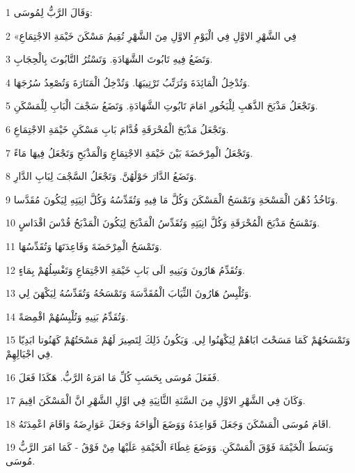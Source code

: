 \par 1 وَقَالَ الرَّبُّ لِمُوسَى:
\par 2 «فِي الشَّهْرِ الاوَّلِ فِي الْيَوْمِ الاوَّلِ مِنَ الشَّهْرِ تُقِيمُ مَسْكَنَ خَيْمَةِ الاجْتِمَاعِ
\par 3 وَتَضَعُ فِيهِ تَابُوتَ الشَّهَادَةِ. وَتَسْتُرُ التَّابُوتَ بِالْحِجَابِ.
\par 4 وَتُدْخِلُ الْمَائِدَةَ وَتُرَتِّبُ تَرْتِيبَهَا. وَتُدْخِلُ الْمَنَارَةَ وَتُصْعِدُ سُرُجَهَا.
\par 5 وَتَجْعَلُ مَذْبَحَ الذَّهَبِ لِلْبَخُورِ امَامَ تَابُوتِ الشَّهَادَةِ. وَتَضَعُ سَجْفَ الْبَابِ لِلْمَسْكَنِ.
\par 6 وَتَجْعَلُ مَذْبَحَ الْمُحْرَقَةِ قُدَّامَ بَابِ مَسْكَنِ خَيْمَةِ الاجْتِمَاعِ.
\par 7 وَتَجْعَلُ الْمِرْحَضَةَ بَيْنَ خَيْمَةِ الاجْتِمَاعِ وَالْمَذْبَحِ وَتَجْعَلُ فِيهَا مَاءً.
\par 8 وَتَضَعُ الدَّارَ حَوْلَهُنَّ. وَتَجْعَلُ السَّجْفَ لِبَابِ الدَّارِ.
\par 9 وَتَاخُذُ دُهْنَ الْمَسْحَةِ وَتَمْسَحُ الْمَسْكَنَ وَكُلَّ مَا فِيهِ وَتُقَدِّسُهُ وَكُلَّ انِيَتِهِ لِيَكُونَ مُقَدَّسا.
\par 10 وَتَمْسَحُ مَذْبَحَ الْمُحْرَقَةِ وَكُلَّ انِيَتِهِ وَتُقَدِّسُ الْمَذْبَحَ لِيَكُونَ الْمَذْبَحُ قُدْسَ اقْدَاسٍ.
\par 11 وَتَمْسَحُ الْمِرْحَضَةَ وَقَاعِدَتَهَا وَتُقَدِّسُهَا.
\par 12 وَتُقَدِّمُ هَارُونَ وَبَنِيهِ الَى بَابِ خَيْمَةِ الاجْتِمَاعِ وَتَغْسِلُهُمْ بِمَاءٍ.
\par 13 وَتُلْبِسُ هَارُونَ الثِّيَابَ الْمُقَدَّسَةَ وَتَمْسَحُهُ وَتُقَدِّسُهُ لِيَكْهَنَ لِي.
\par 14 وَتُقَدِّمُ بَنِيهِ وَتُلْبِسُهُمْ اقْمِصَةً.
\par 15 وَتَمْسَحُهُمْ كَمَا مَسَحْتَ ابَاهُمْ لِيَكْهَنُوا لِي. وَيَكُونُ ذَلِكَ لِتَصِيرَ لَهُمْ مَسْحَتُهُمْ كَهَنُوتا ابَدِيّا فِي اجْيَالِهِمْ.
\par 16 فَفَعَلَ مُوسَى بِحَسَبِ كُلِّ مَا امَرَهُ الرَّبُّ. هَكَذَا فَعَلَ.
\par 17 وَكَانَ فِي الشَّهْرِ الاوَّلِ مِنَ السَّنَةِ الثَّانِيَةِ فِي اوَّلِ الشَّهْرِ انَّ الْمَسْكَنَ اقِيمَ.
\par 18 اقَامَ مُوسَى الْمَسْكَنَ وَجَعَلَ قَوَاعِدَهُ وَوَضَعَ الْوَاحَهُ وَجَعَلَ عَوَارِضَهُ وَاقَامَ اعْمِدَتَهُ.
\par 19 وَبَسَطَ الْخَيْمَةَ فَوْقَ الْمَسْكَنِ. وَوَضَعَ غِطَاءَ الْخَيْمَةِ عَلَيْهَا مِنْ فَوْقُ - كَمَا امَرَ الرَّبُّ مُوسَى.

